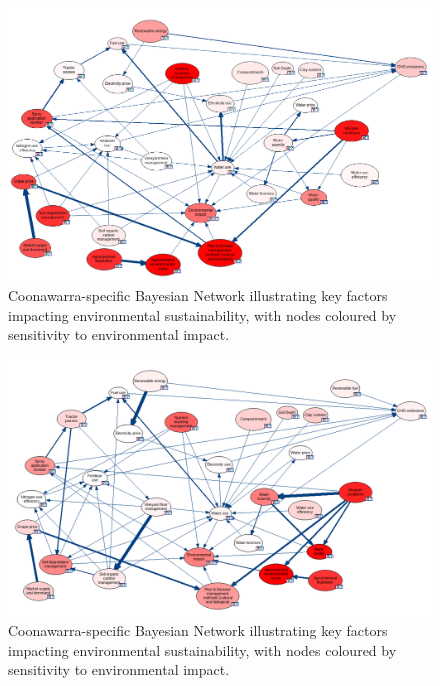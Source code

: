 
\begin{figure}[h!]
    \centering
    \includegraphics[width=\linewidth]{robyn}
    \caption{Coonawarra-specific Bayesian Network illustrating key factors impacting environmental sustainability, with nodes coloured by sensitivity to environmental impact.}\label{fig:robyn}
\end{figure}

\begin{figure}[h!]
    \centering
    \includegraphics[width=\linewidth]{marcel}
    \caption{Coonawarra-specific Bayesian Network illustrating key factors impacting environmental sustainability, with nodes coloured by sensitivity to environmental impact.}\label{fig:marcel}
\end{figure}

